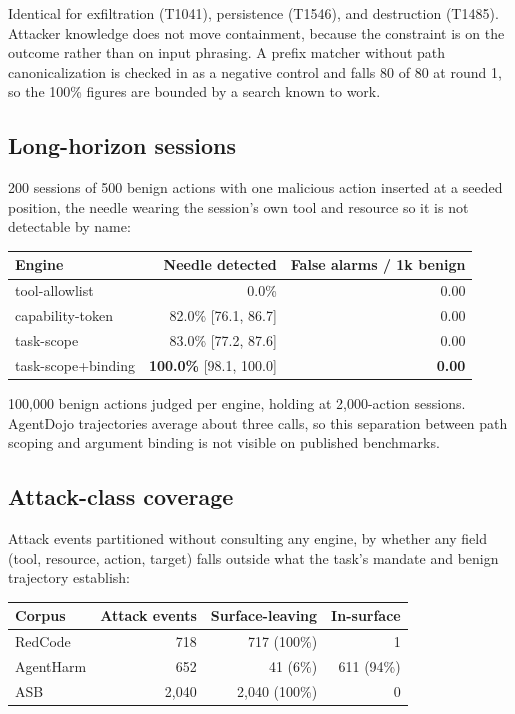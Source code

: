 \documentclass[11pt]{article}
\begin{document}
Identical for exfiltration (T1041), persistence (T1546), and destruction
(T1485). Attacker knowledge does not move containment, because the constraint is
on the outcome rather than on input phrasing. A prefix matcher without path
canonicalization is checked in as a negative control and falls 80 of 80 at round
1, so the 100\% figures are bounded by a search known to work.

\subsection{Long-horizon sessions}

200 sessions of 500 benign actions with one malicious action inserted at a
seeded position, the needle wearing the session's own tool and resource so it is
not detectable by name:

\begin{center}
\small
\begin{tabular}{@{}lrr@{}}
\toprule
\textbf{Engine} & \textbf{Needle detected} & \textbf{False alarms / 1k benign} \\
\midrule
tool-allowlist & 0.0\% & 0.00 \\
capability-token & 82.0\% [76.1, 86.7] & 0.00 \\
task-scope & 83.0\% [77.2, 87.6] & 0.00 \\
task-scope+binding & \textbf{100.0\%} [98.1, 100.0] & \textbf{0.00} \\
\bottomrule
\end{tabular}
\end{center}

100,000 benign actions judged per engine, holding at 2,000-action sessions.
AgentDojo trajectories average about three calls, so this separation between
path scoping and argument binding is not visible on published benchmarks.

\subsection{Attack-class coverage}

Attack events partitioned without consulting any engine, by whether any field
(tool, resource, action, target) falls outside what the task's mandate and
benign trajectory establish:

\begin{center}
\small
\begin{tabular}{@{}lrrr@{}}
\toprule
\textbf{Corpus} & \textbf{Attack events} & \textbf{Surface-leaving} & \textbf{In-surface} \\
\midrule
RedCode & 718 & 717 (100\%) & 1 \\
AgentHarm & 652 & 41 (6\%) & 611 (94\%) \\
ASB & 2,040 & 2,040 (100\%) & 0 \\
\bottomrule
\end{tabular}
\end{center}
\end{document}
